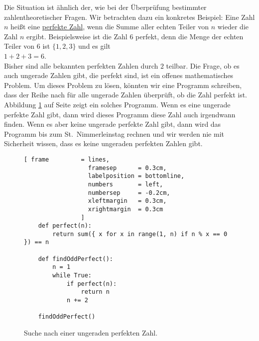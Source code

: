 Die Situation ist ähnlich der, wie bei der Überprüfung bestimmter zahlentheoretischer
Fragen.  Wir betrachten dazu ein konkretes Beispiel: Eine Zahl $n$ heißt 
eine \href{https://de.wikipedia.org/wiki/Vollkommene_Zahl}{perfekte Zahl},
wenn die Summe aller echten Teiler von $n$ wieder die Zahl $n$ ergibt.  Beispielsweise ist
die Zahl $6$ perfekt, denn die Menge der echten Teiler von $6$ ist $\{1,2,3\}$ und es gilt
\\[0.2cm]
\hspace*{1.3cm}
$1 + 2 + 3 = 6$.
\\[0.2cm]
Bisher sind alle bekannten perfekten Zahlen durch $2$ teilbar.  Die Frage, ob es auch
ungerade Zahlen gibt, die perfekt sind, ist ein offenes mathematisches Problem.  Um dieses
Problem zu lösen, könnten wir eine Programm schreiben, dass der Reihe nach für alle
ungerade Zahlen überprüft, ob die Zahl perfekt ist.  Abbildung \ref{fig:Find-Perfect.ipynb}
auf Seite \pageref{fig:Find-Perfect.ipynb} zeigt ein solches Programm.  Wenn es eine ungerade perfekte Zahl
gibt, dann wird dieses Programm diese Zahl auch irgendwann finden.  Wenn es aber keine
ungerade perfekte Zahl gibt, dann wird das Programm bis zum St.~Nimmerleinstag rechnen und
wir werden nie mit Sicherheit wissen, dass es keine ungeraden perfekten Zahlen gibt.

\begin{figure}[!ht]
  \centering
\begin{Verbatim}[ frame         = lines, 
                  framesep      = 0.3cm, 
                  labelposition = bottomline,
                  numbers       = left,
                  numbersep     = -0.2cm,
                  xleftmargin   = 0.3cm,
                  xrightmargin  = 0.3cm
                ]
    def perfect(n):
        return sum({ x for x in range(1, n) if n % x == 0 }) == n
    
    def findOddPerfect():
        n = 1
        while True:
            if perfect(n):
                return n
            n += 2
    
    findOddPerfect()
\end{Verbatim}
\vspace*{-0.3cm}
  \caption{Suche nach einer ungeraden perfekten Zahl.}
  \label{fig:Find-Perfect.ipynb}
\end{figure} 

